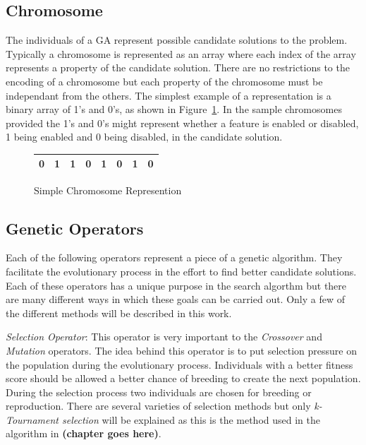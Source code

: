 \subsection{Chromosome}

The individuals of a GA represent possible candidate solutions to the problem. Typically a chromosome is represented as an array where each index of the array represents a property of the candidate solution. There are no restrictions to the encoding of a chromosome but each property of the chromosome must be independant from the others. The simplest example of a representation is a binary array of 1's and 0's, as shown in Figure~\ref{fig:sampleChromosome}. In the sample chromosomes provided the 1's and 0's might represent whether a feature is enabled or disabled, 1 being enabled and 0 being disabled, in the candidate solution.

\begin{figure}[H]
  \label{fig:sampleChromosome}
  \centering
  \begin{tabular}{ | l | l | l | l | l | l | l | l | }
    \hline
    0 & 1 & 1 & 0 & 1 & 0 & 1 & 0 \\
    \hline
  \end{tabular}
  \caption{Simple Chromosome Represention}
\end{figure}

\subsection{Genetic Operators}
\label{subsec:ga-operators}

Each of the following operators represent a piece of a genetic algorithm. They facilitate the evolutionary process in the effort to find better candidate solutions. Each of these operators has a unique purpose in the search algorthm but there are many different ways in which these goals can be carried out. Only a few of the different methods will be described in this work.

\textit{Selection Operator}: This operator is very important to the \textit{Crossover} and \textit{Mutation} operators. The idea behind this operator is to put selection pressure on the population during the evolutionary process. Individuals with a better fitness score should be allowed a better chance of breeding to create the next population. During the selection process two individuals are chosen for breeding or reproduction. There are several varieties of selection methods but only \textit{k-Tournament selection} will be explained as this is the method used in the algorithm in \textbf{(chapter goes here)}.

